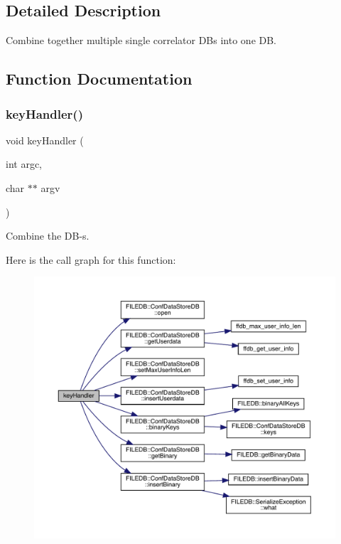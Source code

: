 \subsection{Detailed Description}
Combine together multiple single correlator DB\textquotesingle{}s into one DB. 



\subsection{Function Documentation}
\mbox{\label{adat-devel_2main_2dbutil_2dbscombine_8cc_a4bb6e15c68dd2189289ab3095ab1ff5d}} 
\subsubsection{\texorpdfstring{keyHandler()}{keyHandler()}}
{\footnotesize\ttfamily void key\+Handler (\begin{DoxyParamCaption}\item[{int}]{argc,  }\item[{char $\ast$$\ast$}]{argv }\end{DoxyParamCaption})}



Combine the D\+B-\/s. 

Here is the call graph for this function\+:
\nopagebreak
\begin{figure}[H]
\begin{center}
\leavevmode
\includegraphics[width=350pt]{d1/d29/adat-devel_2main_2dbutil_2dbscombine_8cc_a4bb6e15c68dd2189289ab3095ab1ff5d_cgraph}
\end{center}
\end{figure}
\mbox{\label{adat-devel_2main_2dbutil_2dbscombine_8cc_a3c04138a5bfe5d72780bb7e82a18e627}} 
